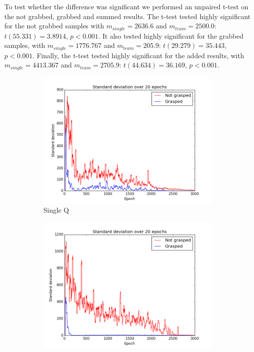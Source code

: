 To test whether the difference was significant we performed an unpaired t-test on the not grabbed, grabbed and summed results. The t-test tested highly significant for the not grabbed samples with $m_{single} = 2636.6$ and $m_{team} = 2500.0$: $t(55.331) = 3.8914$, $p < 0.001$. It also tested highly significant for the grabbed samples, with $m_{single} = 1776.767$ and $m_{team} = 205.9$: $t(29.279) = 35.443$, $p<0.001$. Finally, the t-test tested highly significant for the added results, with $m_{single} = 4413.367$ and $m_{team} = 2705.9$: $t(44.634) = 36.169$, $p < 0.001$. 
\begin{figure}
	\centering
	\begin{subfigure}{.48\textwidth}
		\includegraphics[width=\textwidth]{images/Stdev_single.png}
		\caption{Single Q}
		\label{3a}
	\end{subfigure}
	\begin{subfigure}{0.48\textwidth}
		\includegraphics[width=\textwidth]{images/Stdev_team.png}

\end{subfigure}
\end{figure}
